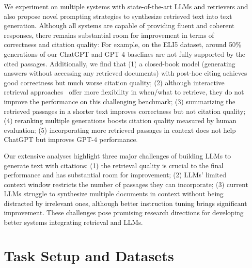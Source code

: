 \documentclass[11pt]{article}
\newcommand{\revise}[1]{{{#1}}}
\begin{document}
We experiment on multiple systems with state-of-the-art LLMs and retrievers and also propose novel prompting strategies to synthesize retrieved text into text generation. 
Although all systems are capable of providing fluent and coherent responses, 
there remains substantial room for improvement in terms of correctness and citation quality: For example, on the ELI5 dataset, 
around 50\% generations of our ChatGPT and GPT-4 baselines are not fully supported by the cited passages. 
Additionally, we find that
(1) a closed-book model (generating answers without accessing any retrieved documents) with post-hoc citing achieves good correctness but much worse citation quality;
(2) although interactive retrieval approaches~\citep{yao2023react,schick2023toolformer} offer more flexibility in when/what to retrieve, they do not improve the performance on this challenging benchmark;
(3) summarizing the retrieved passages in a shorter text improves correctness but not citation quality;
(4) reranking multiple generations boosts citation quality measured by human evaluation;
(5) incorporating more retrieved passages in context does not help ChatGPT but improves GPT-4 performance.


Our extensive analyses  
highlight three major challenges of building LLMs to generate text with citations: 
(1) 
the retrieval quality is crucial to the final performance and  has substantial room for improvement;
(2) 
LLMs' limited context window
restricts the number of passages they can incorporate;
(3) 
\revise{current LLMs struggle to synthesize multiple documents in context
without being distracted by irrelevant ones, although better instruction tuning brings significant improvement.}
These challenges pose promising research directions for 
developing better systems integrating retrieval and LLMs.




















\section{Task Setup and Datasets} %
\end{document}
